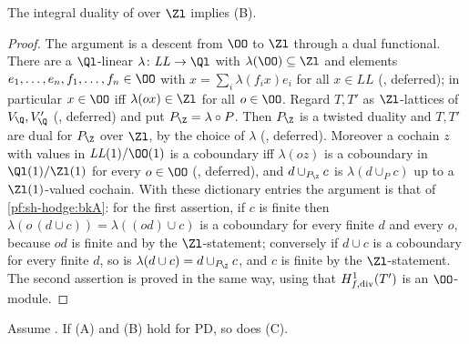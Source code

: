 \begin{proposition}\label{pf:sh-hodge:bkB}
The integral duality of \shhodgeBK{} over $\Zl$ implies (B).
\end{proposition}

\begin{proof}
The argument is a descent from $\OO$ to $\Zl$ through a dual functional. There are a $\Ql$-linear $\lambda\colon\mathit{LL}\to\Ql$ with
$\lambda(\OO)\subseteq\Zl$ and elements $e_1,\dots,e_n,f_1,\dots,f_n\in\OO$ with $x=\sum_i\lambda(f_ix)e_i$ for all $x\in\mathit{LL}$
(, deferred); in particular $x\in\OO$ iff $\lambda(ox)\in\Zl$ for all $o\in\OO$. Regard $T,T'$ as $\Zl$-lattices of $V_\Q,V'_\Q$
(, deferred) and put $P_\Z=\lambda\circ P$. Then $P_\Z$ is a twisted duality and $T,T'$
are dual for $P_\Z$ over $\Zl$, by the choice of $\lambda$ (, deferred). Moreover a cochain $z$
with values in $\mathit{LL}(1)/\OO(1)$ is a coboundary iff $\lambda(oz)$ is a coboundary in $\Ql(1)/\Zl(1)$ for every $o\in\OO$
(, deferred), and $d\cup_{P_\Z}c$ is $\lambda(d\cup_Pc)$ up to a $\Zl(1)$-valued cochain. With these
dictionary entries the argument is that of \cref{pf:sh-hodge:bkA}: for the first assertion, if $c$ is finite then $\lambda(o\,(d\cup c))=
\lambda((od)\cup c)$ is a coboundary for every finite $d$ and every $o$, because $od$ is finite and by the $\Zl$-statement; conversely if $d\cup c$
is a coboundary for every finite $d$, so is $\lambda(d\cup c)=d\cup_{P_\Z}c$, and $c$ is finite by the $\Zl$-statement. The second assertion is
proved in the same way, using that $H^1_{f,\mathrm{div}}(T')$ is an $\OO$-module.
\end{proof}

\begin{proposition}\label{pf:sh-hodge:bkC}
Assume \shhodgeLTD. If (A) and (B) hold for $\mathrm{PD}$, so does (C).
\end{proposition}

